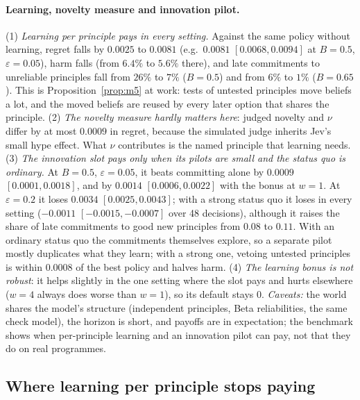\documentclass[11pt]{article}
\theoremstyle{definition}
\begin{document}
\paragraph{Learning, novelty measure and innovation pilot.} (1) \emph{Learning per principle pays in every setting.} Against the same
policy without learning, regret falls by $0.0025$ to $0.0081$ (e.g.\ $0.0081$ $[0.0068,0.0094]$ at
$B=0.5$, $\varepsilon=0.05$), harm falls (from $6.4\%$ to $5.6\%$ there), and late commitments to
unreliable principles fall from $26\%$ to $7\%$ ($B=0.5$) and from $6\%$ to $1\%$ ($B=0.65$). This is
Proposition~\ref{prop:m5} at work: tests of untested principles move beliefs a lot, and the moved
beliefs are reused by every later option that shares the principle. (2) \emph{The novelty measure
hardly matters here}: judged novelty and $\nu$ differ by at most $0.0009$ in regret, because the
simulated judge inherits Jev's small hype effect. What $\nu$ contributes is the named principle that
learning needs. (3) \emph{The innovation slot pays only when its pilots are small and the status quo
is ordinary.} At $B=0.5$, $\varepsilon=0.05$, it beats committing alone by $0.0009$ $[0.0001,0.0018]$,
and by $0.0014$ $[0.0006,0.0022]$ with the bonus at $w=1$. At $\varepsilon=0.2$ it loses $0.0034$
$[0.0025,0.0043]$; with a strong status quo it loses in every setting ($-0.0011$ $[-0.0015,-0.0007]$
over 48 decisions), although it raises the share of late commitments to good new principles from
$0.08$ to $0.11$. With an ordinary status quo the commitments themselves explore, so a separate pilot
mostly duplicates what they learn; with a strong one, vetoing untested principles is within
$0.0008$ of the best policy and halves harm. (4) \emph{The learning bonus is not robust}: it helps
slightly in the one setting where the slot pays and hurts elsewhere ($w=4$ always does worse than
$w=1$), so its default stays $0$. \emph{Caveats:} the world shares the model's structure
(independent principles, Beta reliabilities, the same check model), the horizon is short, and
payoffs are in expectation; the benchmark shows when per-principle learning and an innovation pilot
can pay, not that they do on real programmes.

\subsection{Where learning per principle stops paying}\label{sec:robust}
\end{document}
